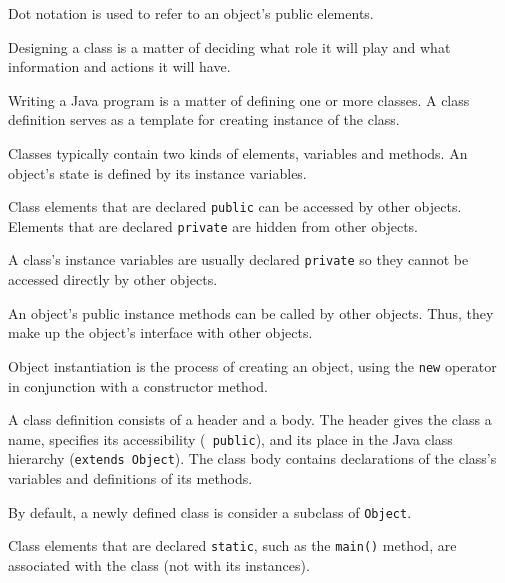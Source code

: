 \label{summaryof-important-points}


\begin{SMBL}

\item Dot notation is used to refer to an object's public elements. 

\item Designing a class is a matter of deciding what role it
will play and what information and actions it will have. 

\item  Writing a Java program is a matter of defining one or
more classes. A class definition serves as a template for creating
instance of the class.  

\item Classes typically contain two kinds of elements, variables and
methods. An object's state is defined by its instance variables.

\item Class elements that are declared {\tt public} can be
accessed by other objects. Elements that are declared {\tt private}
are hidden from other objects.

\item A class's instance variables are usually declared {\tt private}
so they cannot be accessed directly by other objects.

\item An object's public instance methods can be called by other objects.
Thus, they make up the object's interface with other objects.

\item Object instantiation is the process of creating an object,
using the {\tt new} operator in conjunction with a constructor method.

\item A class definition consists of a header and a body. The
header gives the class a name, specifies its accessibility ({\tt
public}), and its place in the Java class hierarchy ({\tt extends
Object}). The class body contains declarations of the class's
variables and definitions of its methods.

\item By default, a newly defined class is consider a subclass of {\tt Object}.

\item Class elements that are declared {\tt static}, such as the
{\tt main()} method, are associated with the class (not with its
instances).


\end{SMBL}

